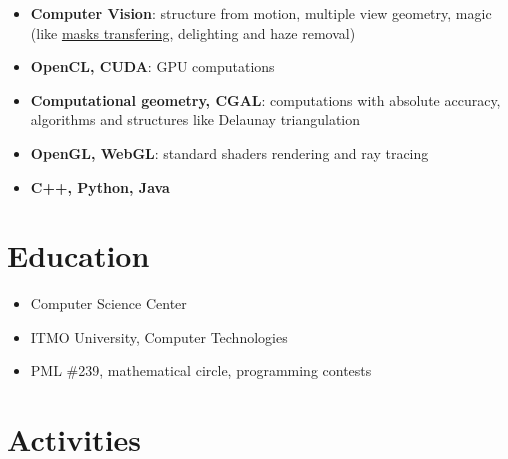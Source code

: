 \documentclass[11pt,oneside]{article}
\newcommand{\hhref}[2]{\href{#1}{\color{blue}#2}}
\begin{document}
\begin{itemize}
    \item{\textbf{Computer Vision}}: structure from motion, multiple view geometry, magic (like  \hhref{http://www.agisoft.com/index.php?id=49}{masks transfering}, delighting and haze removal)

    \item{\textbf{OpenCL, CUDA}}: GPU computations
    
    \item{\textbf{Computational geometry, CGAL}}: computations with absolute accuracy, algorithms and structures like Delaunay triangulation
    
    \item{\textbf{OpenGL, WebGL}}: standard shaders rendering and ray tracing
    
    \item{\textbf{C++, Python, Java}}
\end{itemize}


\vspace{-9pt}
\section*{\textbf{Education}}
\vspace{-9pt}

\begin{itemize}
    \item{Computer Science Center}
    \item{ITMO University, Computer Technologies}
    \item{PML \#239, mathematical circle, programming contests}
\end{itemize}


\vspace{-9pt}
\section*{\textbf{Activities}}
\vspace{-9pt}
\end{document}
